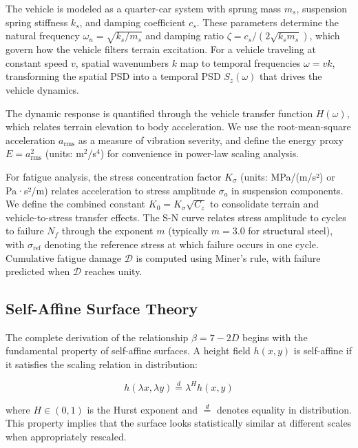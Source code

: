 \documentclass[11pt]{article}
\begin{document}
The vehicle is modeled as a quarter-car system with sprung mass $m_s$, suspension spring stiffness $k_s$, and damping coefficient $c_s$. These parameters determine the natural frequency $\omega_n = \sqrt{k_s/m_s}$ and damping ratio $\zeta = c_s/(2\sqrt{k_s m_s})$, which govern how the vehicle filters terrain excitation. For a vehicle traveling at constant speed $v$, spatial wavenumbers $k$ map to temporal frequencies $\omega = vk$, transforming the spatial PSD into a temporal PSD $S_z(\omega)$ that drives the vehicle dynamics.

The dynamic response is quantified through the vehicle transfer function $H(\omega)$, which relates terrain elevation to body acceleration. We use the root-mean-square acceleration $a_{\text{rms}}$ as a measure of vibration severity, and define the energy proxy $E = a_{\text{rms}}^2$ (units: m$^2$/s$^4$) for convenience in power-law scaling analysis.

For fatigue analysis, the stress concentration factor $K_\sigma$ (units: MPa/(m/s²) or Pa·s²/m) relates acceleration to stress amplitude $\sigma_a$ in suspension components. We define the combined constant $K_0 = K_\sigma\sqrt{C_z}$ to consolidate terrain and vehicle-to-stress transfer effects. The S-N curve relates stress amplitude to cycles to failure $N_f$ through the exponent $m$ (typically $m = 3.0$ for structural steel), with $\sigma_{\text{ref}}$ denoting the reference stress at which failure occurs in one cycle. Cumulative fatigue damage $\mathcal{D}$ is computed using Miner's rule, with failure predicted when $\mathcal{D}$ reaches unity.

\subsection{Self-Affine Surface Theory}

The complete derivation of the relationship $\beta = 7-2D$ begins with the fundamental property of self-affine surfaces. A height field $h(x,y)$ is self-affine if it satisfies the scaling relation in distribution:

\begin{equation}
h(\lambda x, \lambda y) \stackrel{d}{=} \lambda^H h(x,y)
\end{equation}

where $H \in (0,1)$ is the Hurst exponent and $\stackrel{d}{=}$ denotes equality in distribution. This property implies that the surface looks statistically similar at different scales when appropriately rescaled.
\end{document}
